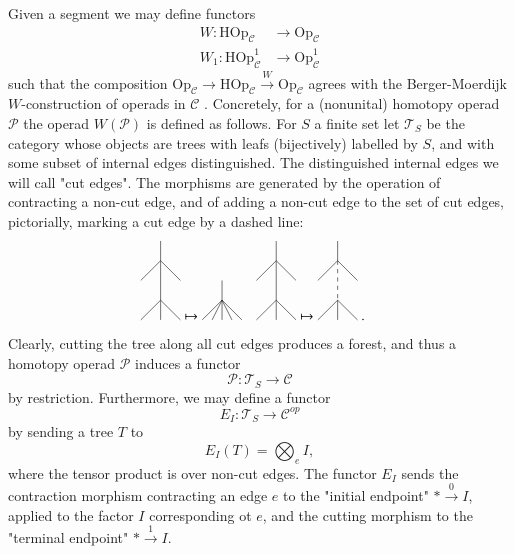 \documentclass[a4paper]{amsart}
\theoremstyle{plain}
\theoremstyle{definition}
\newcommand{\op}{\mathcal}
\newcommand{\mC}{{\mathcal{C}}}
\newcommand{\mT}{{\mathcal{T}}}
\newcommand{\Hop}{{\mathrm{HOp}}}
\newcommand{\Op}{{\mathrm{Op}}}
\begin{document}
Given a segment we may define functors
\begin{align*}
W: \Hop_\mC &\to \Op_\mC \\
W_1: \Hop^1_\mC &\to \Op^1_\mC 
\end{align*}
such that the composition $\Op_\mC \to \Hop_\mC\xrightarrow{W} \Op_\mC$ agrees with the Berger-Moerdijk $W$-construction of operads in $\mC$ \cite{BM}.
Concretely, for a (nonunital) homotopy operad $\op P$ the operad $W(\op P)$ is defined as follows.
For $S$ a finite set let $\mT_S$ be the category whose objects are trees with leafs (bijectively) labelled by $S$, and with some subset of internal edges distinguished. The distinguished internal edges we will call "cut edges".
The morphisms are generated by the operation of contracting a non-cut edge, and of adding a non-cut edge to the set of cut edges, pictorially, marking a cut edge by a dashed line:
\begin{align*}
\begin{tikzpicture}
\coordinate (v) at (0,0.5);
\coordinate (w) at (0,-0.5);
\draw (v) edge (w) edge +(-.5,-.5)  edge +(.5,-.5)  edge +(0,.5)
         (w)   edge +(-.5,-.5)  edge +(.5,-.5)  edge +(0,-.5);
\end{tikzpicture}
&\mapsto
\begin{tikzpicture}
\coordinate (v) at (0,0);
\draw (v)  edge +(-.5,-.5)  edge +(.5,-.5)  edge +(0,.5) edge +(-.25,-.5)  edge +(.25,-.5)  edge +(0,-.5);
\end{tikzpicture}
& 
\begin{tikzpicture}
\coordinate (v) at (0,0.5);
\coordinate (w) at (0,-0.5);
\draw (v) edge (w) edge +(-.5,-.5)  edge +(.5,-.5)  edge +(0,.5)
         (w)   edge +(-.5,-.5)  edge +(.5,-.5)  edge +(0,-.5);
\end{tikzpicture}
&\mapsto
\begin{tikzpicture}
\coordinate (v) at (0,0.5);
\coordinate (w) at (0,-0.5);
\draw (v) edge[dashed] (w) edge +(-.5,-.5)  edge +(.5,-.5)  edge +(0,.5)
         (w)   edge +(-.5,-.5)  edge +(.5,-.5)  edge +(0,-.5);
\end{tikzpicture}\ .
\end{align*}
Clearly, cutting the tree along all cut edges produces a forest, and thus a homotopy operad $\op P$ induces a functor
\[
\op P : \mT_S\to \mC
\]
by restriction.
Furthermore, we may define a functor
\[
E_I : \mT_S \to \mC^{op}
\]
by sending a tree $T$ to 
\[
E_I(T) = \bigotimes_{e} I,
\]
where the tensor product is over non-cut edges.
The functor $E_I$ sends the contraction morphism contracting an edge $e$ to the "initial endpoint" $*\xrightarrow{0} I$, applied to the factor $I$ corresponding ot $e$, and the cutting morphism to the "terminal endpoint" $*\xrightarrow{1} I$.
\end{document}
